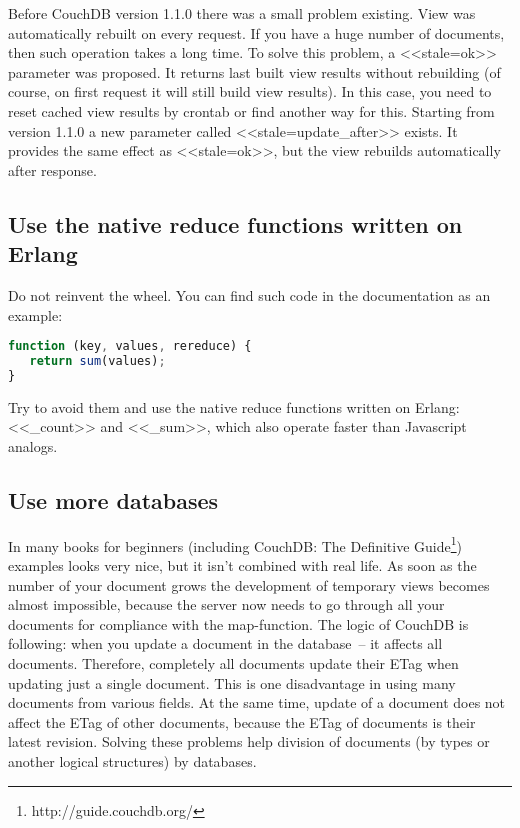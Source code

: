 Before CouchDB version 1.1.0 there was a small problem existing. View was automatically rebuilt on every request. If you have a huge number of documents, then such operation takes a long time. To solve this problem, a <<stale=ok>> parameter was proposed. It returns last built view results without rebuilding (of course, on first request it will still build view results). In this case, you need to reset cached view results by crontab or find another way for this. Starting from version 1.1.0 a new parameter called <<stale=update\_after>> exists. It provides the same effect as <<stale=ok>>, but the view rebuilds automatically after response.

\subsection{Use the native reduce functions written on Erlang}

Do not reinvent the wheel. You can find such code in the documentation as an example:

\begin{lstlisting}[language=Javascript]
function (key, values, rereduce) {
   return sum(values);
}
\end{lstlisting}

Try to avoid them and use the native reduce functions written on Erlang: <<\_count>> and <<\_sum>>, which also operate faster than Javascript analogs.

\subsection{Use more databases}

In many books for beginners (including CouchDB: The Definitive Guide\footnote{http://guide.couchdb.org/}) examples looks very nice, but it isn’t combined with real life. As soon as the number of your document grows the development of temporary views becomes almost impossible, because the server now needs to go through all your documents for compliance with the map-function. The logic of CouchDB is following: when you update a document in the database~-- it affects all documents. Therefore, completely all documents update their ETag when updating just a single document. This is one disadvantage in using many documents from various fields. At the same time, update of a document does not affect the ETag of other documents, because the ETag of documents is their latest revision. Solving these problems help division of documents (by types or another logical structures) by databases.

